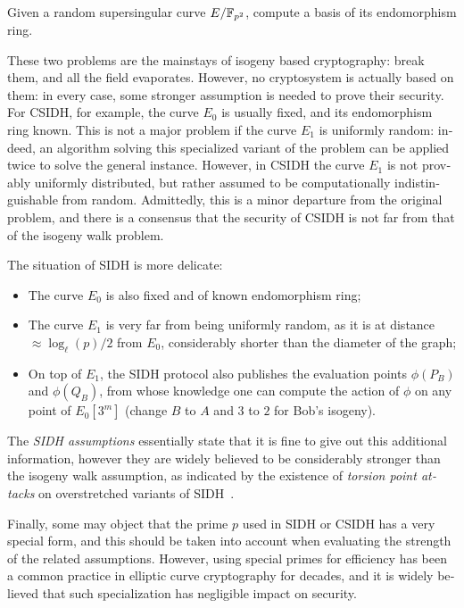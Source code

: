 \begin{otherlanguage}{english}
\begin{definition}
  Given a random supersingular curve $E/\mathbb{F}_{p^2}$, compute a basis of
  its endomorphism ring.
\end{definition}

These two problems are the mainstays of isogeny based cryptography:
break them, and all the field evaporates. However, no cryptosystem is
actually based on them: in every case, some stronger assumption is
needed to prove their security. For CSIDH, for example, the curve
$E_0$ is usually fixed, and its endomorphism ring known. This is not a
major problem if the curve $E_1$ is uniformly random: indeed, an
algorithm solving this specialized variant of the problem can be
applied twice to solve the general instance. However, in CSIDH the
curve $E_1$ is not provably uniformly distributed, but rather assumed
to be computationally indistinguishable from random. Admittedly, this
is a minor departure from the original problem, and there is a
consensus that the security of CSIDH is not far from that of the
isogeny walk problem.

The situation of SIDH is more delicate:
\begin{itemize}
\item The curve $E_0$ is also fixed and of known endomorphism ring;
\item The curve $E_1$ is very far from being uniformly random, as it
  is at distance $\approx\log_\ell(p)/2$ from $E_0$, considerably
  shorter than the diameter of the graph;
\item On top of $E_1$, the SIDH protocol also publishes the evaluation
  points $\phi(P_B)$ and $\phi(Q_B)$, from whose knowledge one can
  compute the action of $\phi$ on any point of $E_0[3^m]$ (change $B$
  to $A$ and $3$ to $2$ for Bob's isogeny).
\end{itemize}

The \emph{SIDH assumptions} essentially state that it is fine to give
out this additional information, however they are widely believed to
be considerably stronger than the isogeny walk assumption, as
indicated by the existence of \emph{torsion point attacks} on
overstretched variants of
SIDH~\cite{AC:Petit17,EPRINT:KMPPS20,cryptoeprint:2021:282}.

Finally, some may object that the prime $p$ used in SIDH or CSIDH has
a very special form, and this should be taken into account when
evaluating the strength of the related assumptions. However, using
special primes for efficiency has been a common practice in elliptic
curve cryptography for decades, and it is widely believed that such
specialization has negligible impact on security.


\end{otherlanguage}

